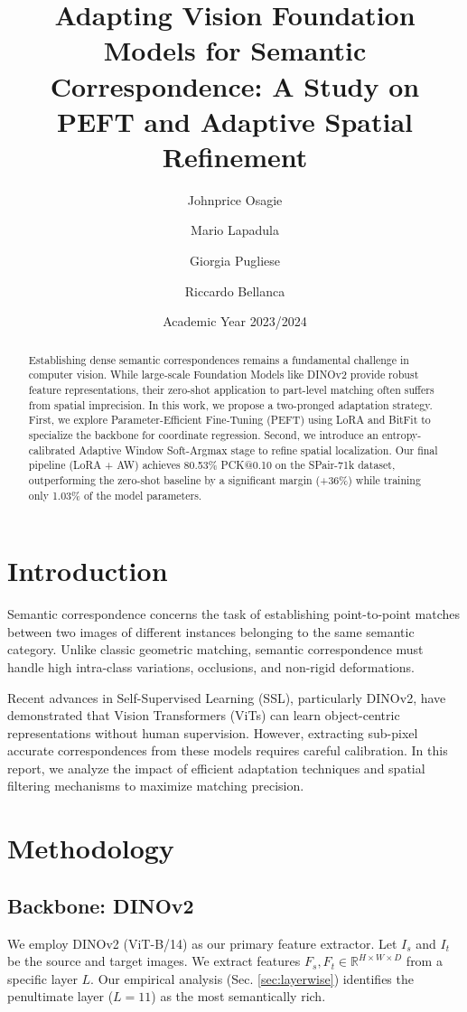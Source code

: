 \documentclass[10pt,twocolumn,letterpaper]{article}
\title{\textbf{Adapting Vision Foundation Models for Semantic Correspondence: A Study on PEFT and Adaptive Spatial Refinement}}
\author[1]{Johnprice Osagie}
\author[1]{Mario Lapadula}
\author[1]{Giorgia Pugliese}
\author[1]{Riccardo Bellanca}
\affil[1]{Politecnico di Torino, Corso di Laurea in Ingegneria Informatica}
\date{Academic Year 2023/2024}
\begin{document}
\maketitle

\begin{abstract}
Establishing dense semantic correspondences remains a fundamental challenge in computer vision. While large-scale Foundation Models like DINOv2 provide robust feature representations, their zero-shot application to part-level matching often suffers from spatial imprecision. In this work, we propose a two-pronged adaptation strategy. First, we explore Parameter-Efficient Fine-Tuning (PEFT) using LoRA and BitFit to specialize the backbone for coordinate regression. Second, we introduce an entropy-calibrated Adaptive Window Soft-Argmax stage to refine spatial localization. Our final pipeline (LoRA + AW) achieves 80.53\% PCK@0.10 on the SPair-71k dataset, outperforming the zero-shot baseline by a significant margin (+36\%) while training only 1.03\% of the model parameters.
\end{abstract}

\section{Introduction}
Semantic correspondence concerns the task of establishing point-to-point matches between two images of different instances belonging to the same semantic category. Unlike classic geometric matching, semantic correspondence must handle high intra-class variations, occlusions, and non-rigid deformations. 

Recent advances in Self-Supervised Learning (SSL), particularly DINOv2, have demonstrated that Vision Transformers (ViTs) can learn object-centric representations without human supervision. However, extracting sub-pixel accurate correspondences from these models requires careful calibration. In this report, we analyze the impact of efficient adaptation techniques and spatial filtering mechanisms to maximize matching precision.

\section{Methodology}
\subsection{Backbone: DINOv2}
We employ DINOv2 (ViT-B/14) as our primary feature extractor. Let $I_s$ and $I_t$ be the source and target images. We extract features $F_s, F_t \in \mathbb{R}^{H \times W \times D}$ from a specific layer $L$. Our empirical analysis (Sec. \ref{sec:layerwise}) identifies the penultimate layer ($L=11$) as the most semantically rich.
\end{document}
